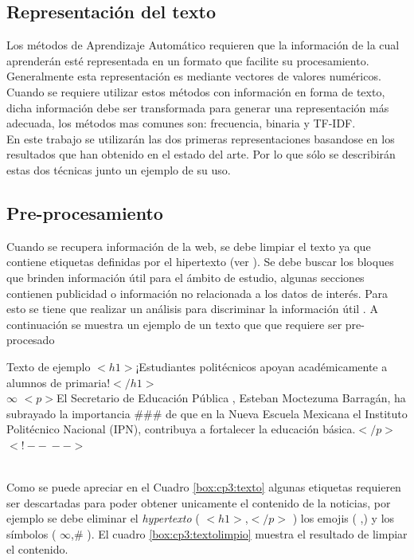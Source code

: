\subsection[Representación del T]{Representación del texto}

Los métodos de Aprendizaje Automático requieren que la información de la cual aprenderán esté representada en un
formato que facilite su procesamiento. Generalmente esta representación es mediante vectores de valores numéricos. 
Cuando se requiere utilizar estos métodos con información en forma de texto, dicha
información debe ser transformada para generar una representación más adecuada, los métodos mas comunes son: frecuencia, binaria y TF-IDF.\\ 


En este trabajo se utilizarán las dos primeras representaciones basandose en los resultados que han obtenido en el estado del arte. Por lo que sólo se describirán estas dos técnicas junto un ejemplo de su uso.\\


\subsection[Pre-procesamiento]{Pre-procesamiento}


Cuando se recupera  información de la web, se debe limpiar el texto ya que contiene etiquetas definidas por el hipertexto (ver ). Se debe buscar los bloques que brinden información útil para el ámbito de estudio, algunas secciones contienen publicidad o información no relacionada a los datos de interés. Para esto se tiene que realizar un análisis para discriminar la información útil \citep{CD1}. A continuación se muestra un ejemplo de un texto que que requiere ser pre-procesado\\

\begin{mygraybox}[label={box:cp3:texto}]{Texto de ejemplo} 
$<h1>$¡Estudiantes politécnicos apoyan académicamente a alumnos de primaria!$</h1>$\\

$\infty$
$<p>$El Secretario de Educación Pública \Tribar[1][blue][blue!50][blue!20], Esteban Moctezuma Barragán, ha subrayado la importancia \#\#\# de que en la Nueva Escuela Mexicana el Instituto Politécnico Nacional (IPN)\dSmiley, contribuya a fortalecer la educación básica.$</p>$\\
$<!--\ -->$
\end{mygraybox}
\ \\
Como se puede apreciar en el Cuadro \ref{box:cp3:texto} algunas etiquetas requieren ser descartadas para poder obtener unicamente el contenido de la noticias, por ejemplo se debe eliminar el \textit{hypertexto} ( $<h1>$,$</p>$ ) los emojis ( \dSmiley,\Tribar[1][blue][blue!50][blue!20] ) y los símbolos ( $\infty$,\# ). El cuadro \ref{box:cp3:textolimpio} muestra el resultado de limpiar el contenido.\\

